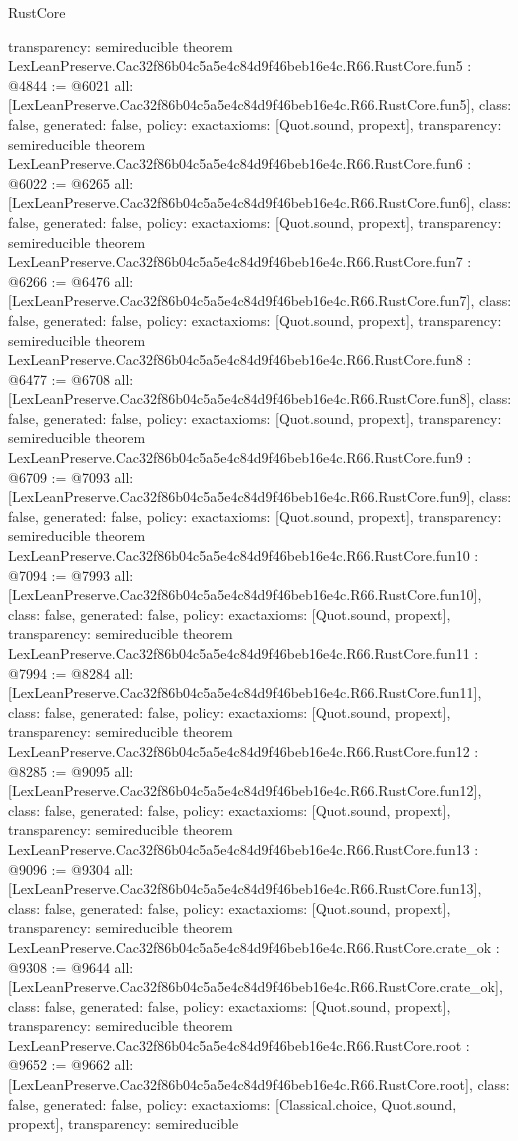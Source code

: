 \begin{lexlean}{RustCore}
\begin{coremodule}
{  transparency: semireducible
}
theorem LexLeanPreserve.Cac32f86b04c5a5e4c84d9f46beb16e4c.R66.RustCore.fun5 : @4844 := @6021 {
  all: [LexLeanPreserve.Cac32f86b04c5a5e4c84d9f46beb16e4c.R66.RustCore.fun5],
  class: false,
  generated: false,
  policy: exact{axioms: [Quot.sound, propext]},
  transparency: semireducible
}
theorem LexLeanPreserve.Cac32f86b04c5a5e4c84d9f46beb16e4c.R66.RustCore.fun6 : @6022 := @6265 {
  all: [LexLeanPreserve.Cac32f86b04c5a5e4c84d9f46beb16e4c.R66.RustCore.fun6],
  class: false,
  generated: false,
  policy: exact{axioms: [Quot.sound, propext]},
  transparency: semireducible
}
theorem LexLeanPreserve.Cac32f86b04c5a5e4c84d9f46beb16e4c.R66.RustCore.fun7 : @6266 := @6476 {
  all: [LexLeanPreserve.Cac32f86b04c5a5e4c84d9f46beb16e4c.R66.RustCore.fun7],
  class: false,
  generated: false,
  policy: exact{axioms: [Quot.sound, propext]},
  transparency: semireducible
}
theorem LexLeanPreserve.Cac32f86b04c5a5e4c84d9f46beb16e4c.R66.RustCore.fun8 : @6477 := @6708 {
  all: [LexLeanPreserve.Cac32f86b04c5a5e4c84d9f46beb16e4c.R66.RustCore.fun8],
  class: false,
  generated: false,
  policy: exact{axioms: [Quot.sound, propext]},
  transparency: semireducible
}
theorem LexLeanPreserve.Cac32f86b04c5a5e4c84d9f46beb16e4c.R66.RustCore.fun9 : @6709 := @7093 {
  all: [LexLeanPreserve.Cac32f86b04c5a5e4c84d9f46beb16e4c.R66.RustCore.fun9],
  class: false,
  generated: false,
  policy: exact{axioms: [Quot.sound, propext]},
  transparency: semireducible
}
theorem LexLeanPreserve.Cac32f86b04c5a5e4c84d9f46beb16e4c.R66.RustCore.fun10 : @7094 := @7993 {
  all: [LexLeanPreserve.Cac32f86b04c5a5e4c84d9f46beb16e4c.R66.RustCore.fun10],
  class: false,
  generated: false,
  policy: exact{axioms: [Quot.sound, propext]},
  transparency: semireducible
}
theorem LexLeanPreserve.Cac32f86b04c5a5e4c84d9f46beb16e4c.R66.RustCore.fun11 : @7994 := @8284 {
  all: [LexLeanPreserve.Cac32f86b04c5a5e4c84d9f46beb16e4c.R66.RustCore.fun11],
  class: false,
  generated: false,
  policy: exact{axioms: [Quot.sound, propext]},
  transparency: semireducible
}
theorem LexLeanPreserve.Cac32f86b04c5a5e4c84d9f46beb16e4c.R66.RustCore.fun12 : @8285 := @9095 {
  all: [LexLeanPreserve.Cac32f86b04c5a5e4c84d9f46beb16e4c.R66.RustCore.fun12],
  class: false,
  generated: false,
  policy: exact{axioms: [Quot.sound, propext]},
  transparency: semireducible
}
theorem LexLeanPreserve.Cac32f86b04c5a5e4c84d9f46beb16e4c.R66.RustCore.fun13 : @9096 := @9304 {
  all: [LexLeanPreserve.Cac32f86b04c5a5e4c84d9f46beb16e4c.R66.RustCore.fun13],
  class: false,
  generated: false,
  policy: exact{axioms: [Quot.sound, propext]},
  transparency: semireducible
}
theorem LexLeanPreserve.Cac32f86b04c5a5e4c84d9f46beb16e4c.R66.RustCore.crate_ok : @9308 := @9644 {
  all: [LexLeanPreserve.Cac32f86b04c5a5e4c84d9f46beb16e4c.R66.RustCore.crate_ok],
  class: false,
  generated: false,
  policy: exact{axioms: [Quot.sound, propext]},
  transparency: semireducible
}
theorem LexLeanPreserve.Cac32f86b04c5a5e4c84d9f46beb16e4c.R66.RustCore.root : @9652 := @9662 {
  all: [LexLeanPreserve.Cac32f86b04c5a5e4c84d9f46beb16e4c.R66.RustCore.root],
  class: false,
  generated: false,
  policy: exact{axioms: [Classical.choice, Quot.sound, propext]},
  transparency: semireducible
}


\end{coremodule}
\end{lexlean}
